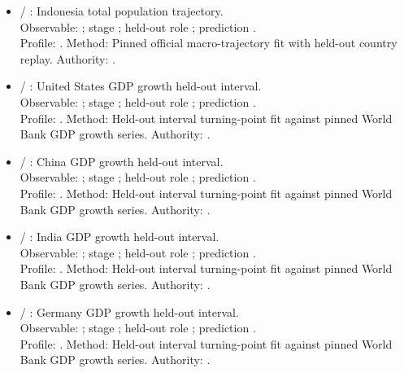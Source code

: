 \begin{itemize}
\item {} / : Indonesia total population trajectory.\\ Observable: ; stage ; held-out role ; prediction .\\ Profile: . Method: Pinned official macro-trajectory fit with held-out country replay. Authority: .
\item {} / : United States GDP growth held-out interval.\\ Observable: ; stage ; held-out role ; prediction .\\ Profile: . Method: Held-out interval turning-point fit against pinned World Bank GDP growth series. Authority: .
\item {} / : China GDP growth held-out interval.\\ Observable: ; stage ; held-out role ; prediction .\\ Profile: . Method: Held-out interval turning-point fit against pinned World Bank GDP growth series. Authority: .
\item {} / : India GDP growth held-out interval.\\ Observable: ; stage ; held-out role ; prediction .\\ Profile: . Method: Held-out interval turning-point fit against pinned World Bank GDP growth series. Authority: .
\item {} / : Germany GDP growth held-out interval.\\ Observable: ; stage ; held-out role ; prediction .\\ Profile: . Method: Held-out interval turning-point fit against pinned World Bank GDP growth series. Authority: .

\end{itemize}
